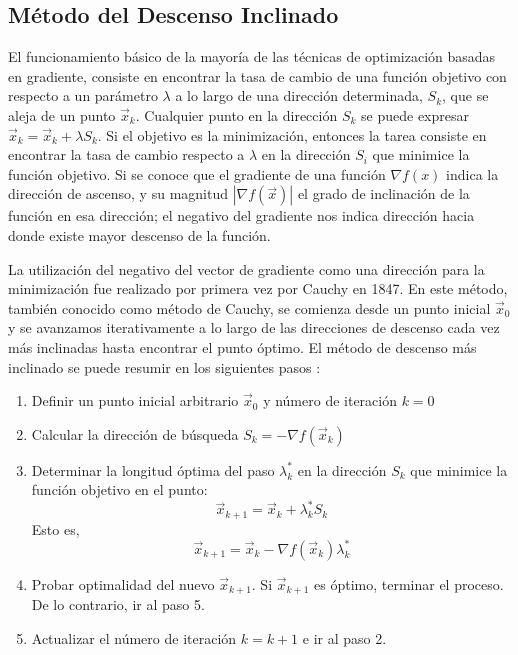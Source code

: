 \subsection{Método del Descenso Inclinado}
El funcionamiento básico de  la mayoría de las técnicas de optimización basadas en gradiente, consiste en encontrar la tasa de cambio de una función objetivo con respecto a un parámetro $\lambda$ a lo largo de una dirección determinada, $S_k$, que se aleja de un punto $\vec{x}_k$. Cualquier punto en la dirección $S_k$ se puede expresar $\vec{x}_k=\vec{x}_k+ \lambda S_k$. Si el objetivo es la minimización, entonces la tarea consiste en encontrar la tasa de cambio respecto a $\lambda$ en la dirección $S_i$ que minimice la función objetivo. Si se conoce que el gradiente de una función $\nabla f(x)$ indica la dirección de ascenso, y su magnitud $|\nabla f(\vec{x})|$ el grado de inclinación de la función en esa dirección; el negativo del gradiente nos indica dirección hacia donde existe mayor descenso de la función. 

La utilización del negativo del vector de gradiente como una dirección para la minimización fue realizado por primera vez por Cauchy en 1847. En este método, también conocido como método de Cauchy, se comienza desde un punto inicial $\vec{x}_0$ y se avanzamos iterativamente a lo largo de las direcciones de descenso cada vez más inclinadas hasta encontrar el punto óptimo. El método de descenso más inclinado se puede resumir en los siguientes pasos \cite{rao_engineering_2009}:
\begin{enumerate}
\item Definir un punto inicial arbitrario $\vec{x}_0$ y número de iteración $k =0$
\item Calcular la dirección de búsqueda $S_k = -\nabla f(\vec{x}_k)$
\item Determinar la longitud óptima del paso $\lambda^*_k$ en la dirección $S_k$ que minimice la función objetivo en el punto:
\begin{equation}
\vec{x}_{k+1} = \vec{x}_k +\lambda^*_k S_k
\end{equation}
Esto es,
\begin{equation}
\vec{x}_{k+1} = \vec{x}_k -\nabla f(\vec{x}_k)\lambda^*_k
\end{equation}
\item Probar optimalidad del nuevo $\vec{x}_{k+1}$. Si $\vec{x}_{k+1} $ es óptimo, terminar el proceso. De lo contrario, ir al paso 5.
\item Actualizar el número de iteración $k = k +1$ e ir al paso 2.
\end{enumerate}

